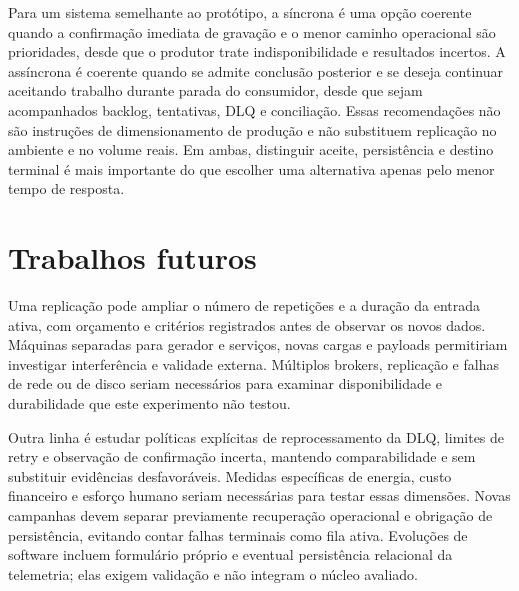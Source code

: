 Para um sistema semelhante ao protótipo, a síncrona é uma opção coerente quando a confirmação imediata de gravação e o menor caminho operacional são prioridades, desde que o produtor trate indisponibilidade e resultados incertos. A assíncrona é coerente quando se admite conclusão posterior e se deseja continuar aceitando trabalho durante parada do consumidor, desde que sejam acompanhados backlog, tentativas, DLQ e conciliação. Essas recomendações não são instruções de dimensionamento de produção e não substituem replicação no ambiente e no volume reais. Em ambas, distinguir aceite, persistência e destino terminal é mais importante do que escolher uma alternativa apenas pelo menor tempo de resposta.

\section{Trabalhos futuros}

Uma replicação pode ampliar o número de repetições e a duração da entrada ativa, com orçamento e critérios registrados antes de observar os novos dados. Máquinas separadas para gerador e serviços, novas cargas e payloads permitiriam investigar interferência e validade externa. Múltiplos brokers, replicação e falhas de rede ou de disco seriam necessários para examinar disponibilidade e durabilidade que este experimento não testou.

Outra linha é estudar políticas explícitas de reprocessamento da DLQ, limites de retry e observação de confirmação incerta, mantendo comparabilidade e sem substituir evidências desfavoráveis. Medidas específicas de energia, custo financeiro e esforço humano seriam necessárias para testar essas dimensões. Novas campanhas devem separar previamente recuperação operacional e obrigação de persistência, evitando contar falhas terminais como fila ativa. Evoluções de software incluem formulário próprio e eventual persistência relacional da telemetria; elas exigem validação e não integram o núcleo avaliado.
